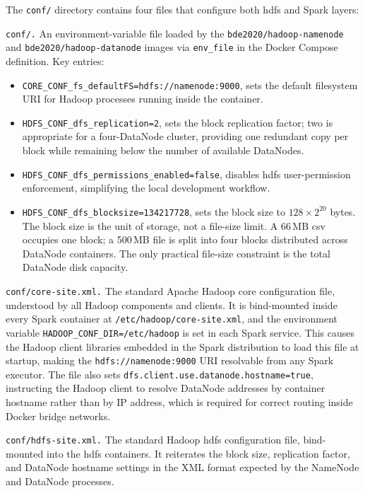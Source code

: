 The \texttt{conf/} directory contains four files that configure both \gls{hdfs} and Spark
layers:

\begin{sloppypar}
\texttt{conf/.}
An environment-variable file loaded by the \texttt{bde2020/\allowbreak{}hadoop-namenode} and
\texttt{bde2020/\allowbreak{}hadoop-datanode} images via \texttt{env\_file} in the Docker Compose
definition.  Key entries:
\begin{itemize}
    \item \texttt{CORE\_CONF\_fs\_defaultFS=hdfs://namenode:9000}, sets the default
          filesystem URI for Hadoop processes running inside the container.
    \item \texttt{HDFS\_CONF\_dfs\_replication=2}, sets the block replication factor;
          two is appropriate for a four-DataNode cluster, providing one redundant copy per
          block while remaining below the number of available DataNodes.
    \item \texttt{HDFS\_CONF\_dfs\_permissions\_enabled=false}, disables \gls{hdfs}
          user-permission enforcement, simplifying the local development workflow.
    \item \texttt{HDFS\_CONF\_dfs\_blocksize=134217728}, sets the block size to
          $128 \times 2^{20}$ bytes.  The block size is the unit of storage, not a
          file-size limit.  A 66\,MB \gls{csv} occupies one block; a 500\,MB file is
          split into four blocks distributed across DataNode containers.
          The only practical file-size constraint is the total DataNode disk capacity.
\end{itemize}

\texttt{conf/core-site.xml.}
The standard Apache Hadoop core configuration file, understood by all Hadoop
components and clients.  It is bind-mounted inside every Spark container at
\texttt{/etc/hadoop/core-site.xml}, and the environment variable
\texttt{HADOOP\_CONF\_DIR=/etc/hadoop} is set in each Spark service.  This causes the Hadoop
client libraries embedded in the Spark distribution to load this file at startup, making the
\texttt{hdfs://namenode:9000} URI resolvable from any Spark executor.  The file also sets
\texttt{dfs.client.use.\allowbreak{}datanode.\allowbreak{}hostname=true}, instructing the Hadoop client to resolve
DataNode addresses by container hostname rather than by IP address, which is required for
correct routing inside Docker bridge networks.

\texttt{conf/hdfs-site.xml.}
The standard Hadoop \gls{hdfs} configuration file, bind-mounted into the \gls{hdfs}
containers.  It reiterates the block size, replication factor, and DataNode hostname settings
in the XML format expected by the NameNode and DataNode processes.


\end{sloppypar}
